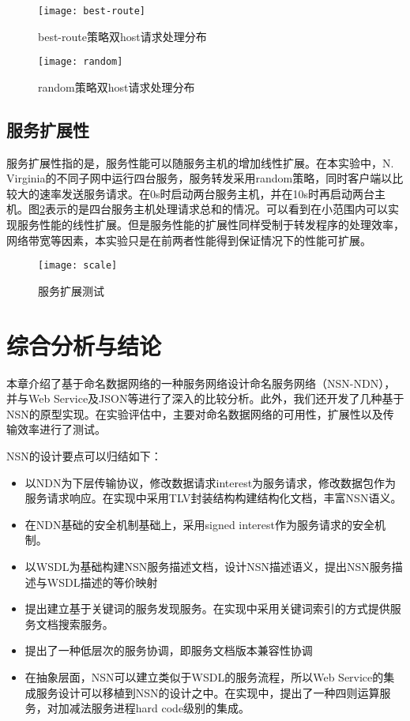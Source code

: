 \begin{figure}[H]
\begin{minipage}[t]{0.5\linewidth}
\centering
\texttt{[image: best-route]}
\caption{best-route策略双host请求处理分布}
\label{fig:strategy:best-route}
\end{minipage}%
\begin{minipage}[t]{0.5\linewidth}
\centering
\texttt{[image: random]}
\caption{random策略双host请求处理分布}
\label{fig:strategy:random}
\end{minipage}
\end{figure}

\subsection{服务扩展性}
服务扩展性指的是，服务性能可以随服务主机的增加线性扩展。在本实验中，N. Virginia的不同子网中运行四台服务，服务转发采用random策略，同时客户端以比较大的速率发送服务请求。在0s时启动两台服务主机，并在10s时再启动两台主机。图\ref{fig:scale}表示的是四台服务主机处理请求总和的情况。可以看到在小范围内可以实现服务性能的线性扩展。但是服务性能的扩展性同样受制于转发程序的处理效率，网络带宽等因素，本实验只是在前两者性能得到保证情况下的性能可扩展。

\begin{figure}[H]
  \centering
  \texttt{[image: scale]}
  \caption{服务扩展测试}
  \label{fig:scale}
\end{figure}

\section{综合分析与结论}
本章介绍了基于命名数据网络的一种服务网络设计命名服务网络（NSN-NDN），并与Web Service及JSON等进行了深入的比较分析。此外，我们还开发了几种基于NSN的原型实现。在实验评估中，主要对命名数据网络的可用性，扩展性以及传输效率进行了测试。

NSN的设计要点可以归结如下：
\begin{itemize}
\item 以NDN为下层传输协议，修改数据请求interest为服务请求，修改数据包作为服务请求响应。在实现中采用TLV封装结构构建结构化文档，丰富NSN语义。
\item 在NDN基础的安全机制基础上，采用signed interest作为服务请求的安全机制。
\item 以WSDL为基础构建NSN服务描述文档，设计NSN描述语义，提出NSN服务描述与WSDL描述的等价映射
\item 提出建立基于关键词的服务发现服务。在实现中采用关键词索引的方式提供服务文档搜索服务。
\item 提出了一种低层次的服务协调，即服务文档版本兼容性协调
\item 在抽象层面，NSN可以建立类似于WSDL的服务流程，所以Web Service的集成服务设计可以移植到NSN的设计之中。在实现中，提出了一种四则运算服务，对加减法服务进程hard code级别的集成。
\end{itemize}

